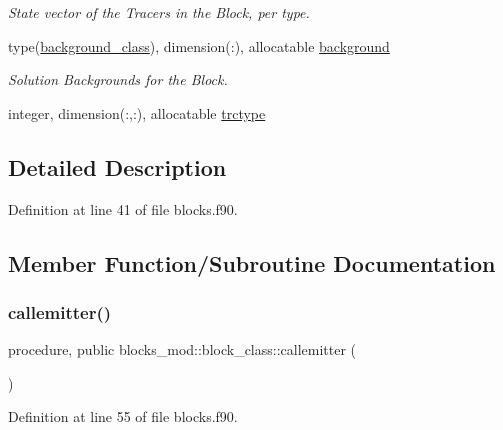 \begin{DoxyCompactItemize}
\begin{DoxyCompactList}\small\item\em State vector of the Tracers in the Block, per type. \end{DoxyCompactList}\item 
type(\mbox{\hyperlink{structbackground__mod_1_1background__class}{background\+\_\+class}}), dimension(\+:), allocatable \mbox{\hyperlink{structblocks__mod_1_1block__class_a774c07bf82d1392236abc81c285ea943}{background}}
\begin{DoxyCompactList}\small\item\em Solution Backgrounds for the Block. \end{DoxyCompactList}\item 
integer, dimension(\+:,\+:), allocatable \mbox{\hyperlink{structblocks__mod_1_1block__class_a3ad957b5a86ff6c774dc76521bf5126e}{trctype}}
\end{DoxyCompactItemize}


\subsection{Detailed Description}


Definition at line 41 of file blocks.\+f90.



\subsection{Member Function/\+Subroutine Documentation}
\mbox{\label{structblocks__mod_1_1block__class_ad1d0f1aca1323fad86177deb0b818a51}} 
\subsubsection{\texorpdfstring{callemitter()}{callemitter()}}
{\footnotesize\ttfamily procedure, public blocks\+\_\+mod\+::block\+\_\+class\+::callemitter (\begin{DoxyParamCaption}{ }\end{DoxyParamCaption})}



Definition at line 55 of file blocks.\+f90.

\mbox{\label{structblocks__mod_1_1block__class_a17439a0d58c047428bee213d2a7b4bd5}} 
